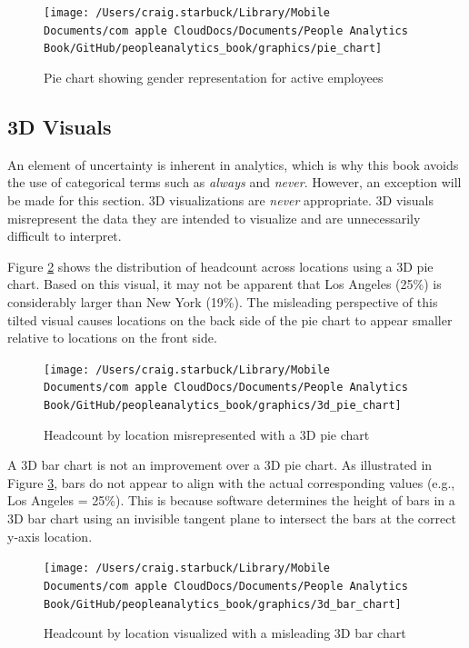 \documentclass[
]{book}
\begin{document}
\begin{figure}

{\centering \texttt{[image: /Users/craig.starbuck/Library/Mobile Documents/com~apple~CloudDocs/Documents/People Analytics Book/GitHub/peopleanalytics\_book/graphics/pie\_chart]} 

}

\caption{Pie chart showing gender representation for active employees}\label{fig:pie-chart}
\end{figure}

\hypertarget{d-visuals}{%
\subsection{3D Visuals}\label{d-visuals}}

An element of uncertainty is inherent in analytics, which is why this book avoids the use of categorical terms such as \emph{always} and \emph{never}. However, an exception will be made for this section. 3D visualizations are \emph{never} appropriate. 3D visuals misrepresent the data they are intended to visualize and are unnecessarily difficult to interpret.

Figure \ref{fig:3d-pie-chart} shows the distribution of headcount across locations using a 3D pie chart. Based on this visual, it may not be apparent that Los Angeles (25\%) is considerably larger than New York (19\%). The misleading perspective of this tilted visual causes locations on the back side of the pie chart to appear smaller relative to locations on the front side.

\begin{figure}

{\centering \texttt{[image: /Users/craig.starbuck/Library/Mobile Documents/com~apple~CloudDocs/Documents/People Analytics Book/GitHub/peopleanalytics\_book/graphics/3d\_pie\_chart]} 

}

\caption{Headcount by location misrepresented with a 3D pie chart}\label{fig:3d-pie-chart}
\end{figure}

A 3D bar chart is not an improvement over a 3D pie chart. As illustrated in Figure \ref{fig:3d-bar-chart}, bars do not appear to align with the actual corresponding values (e.g., Los Angeles = 25\%). This is because software determines the height of bars in a 3D bar chart using an invisible tangent plane to intersect the bars at the correct y-axis location.

\begin{figure}

{\centering \texttt{[image: /Users/craig.starbuck/Library/Mobile Documents/com~apple~CloudDocs/Documents/People Analytics Book/GitHub/peopleanalytics\_book/graphics/3d\_bar\_chart]} 

}

\caption{Headcount by location visualized with a misleading 3D bar chart}\label{fig:3d-bar-chart}
\end{figure}
\end{document}
